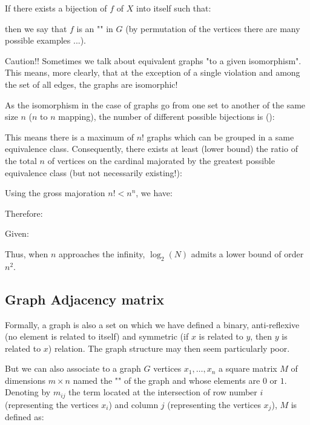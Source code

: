{\begin{enumerate}
		If there exists a bijection of $f$ of $X$ into itself such that:
		
		then we say that $f$ is an "" in $G$ (by permutation of the vertices there are many possible examples ...).
		
		\begin{tcolorbox}[title=Remark,colframe=black,arc=10pt]
		Caution!! Sometimes we talk about equivalent graphs "to a given isomorphism". This means, more clearly, that at the exception of a single violation and among the set of all edges, the graphs are isomorphic!
		\end{tcolorbox}
		As the isomorphism in the case of graphs go from one set to another of the same size $n$ ($n$ to $n$ mapping), the number of different possible bijections is ():
		
		This means there is a maximum of $n!$ graphs which can be grouped in a same equivalence class. Consequently, there exists at least (lower bound) the ratio of the total $n$ of vertices on the cardinal majorated by the greatest possible equivalence class (but not necessarily existing!):
			
		Using the gross majoration $n!<n^n$, we have:
		
		Therefore:
		
		Given:
		
		Thus, when $n$ approaches the infinity, $\log_2(N)$ admits a lower bound of order $n^2$.
	\end{enumerate}
	
	\pagebreak
	\subsection{Graph Adjacency matrix}\label{adjacency matrix}
	Formally, a graph is also a set on which we have defined a binary, anti-reflexive (no element is related to itself) and symmetric (if $x$ is related to $y$, then $y$ is related to $x$) relation. The graph structure may then seem particularly poor.
	
	But we can also associate to a graph $G$ vertices $x_1,\ldots, x_n$ a square matrix $M$ of dimensions $m\times n$ named the "" of the graph and whose elements are $0$ or $1$. Denoting by $m_{ij}$ the term located at the intersection of row number $i$ (representing the vertices $x_i$) and column $j$ (representing the vertices $x_j$), $M$ is defined as:
	
}
